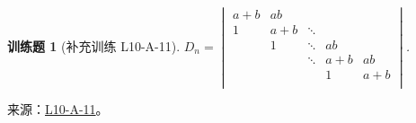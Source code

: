 \documentclass[12pt,fontset=fandol]{ctexart}
\newtheorem{exercise}{训练题}[section]
\begin{document}
\begin{exercise}[补充训练 L10-A-11]\label{prob:L10-A-11}
$D_n=\begin{vmatrix}
                a+b & ab  &        &     &     \\
                1   & a+b & \ddots &     &     \\
                    & 1   & \ddots & ab  &     \\
                    &     & \ddots & a+b & ab  \\
                    &     &        & 1   & a+b \\
            \end{vmatrix}$.
\end{exercise}
\noindent 来源：\href{https://github.com/yhwu-is/Linear-Algebra-Left-Undone/blob/new/%E8%AE%B2%E4%B9%89/%E4%B8%93%E9%A2%98/10%20%E8%A1%8C%E5%88%97%E5%BC%8F.tex}{L10-A-11}。
\end{document}
